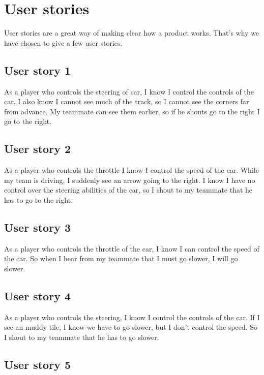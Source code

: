 \documentclass{article}
\begin{document}
\section{User stories}
User stories are a great way of making clear how a product works. That's why we have chosen to give a few user stories. 

\subsection{User story 1}
As a player who controls the steering of car, I know I control the controls of the car. I also know I cannot see much of the track, so I cannot see the corners far from advance. My teammate can see them earlier, so if he shouts go to the right I go to the right.

\subsection{User story 2}
As a player who controls the throttle I know I control the speed of the car. While my team is driving, I suddenly see an arrow going to the right. I know I have no control over the steering abilities of the car, so I shout to my teammate that he has to go to the right.

\subsection{User story 3}
As a player who controls the throttle of the car, I know I can control the speed of the car. So when I hear from my teammate that I must go slower, I will go slower.

\subsection{User story 4}
As a player who controls the steering, I know I control the controls of the car. If I see an muddy tile, I know we have to go slower, but I don't control the speed. So I shout to my teammate that he has to go slower.

\subsection{User story 5}
\end{document}
